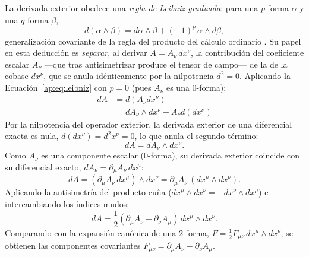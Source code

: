 \primerparrafo La derivada exterior obedece una \emph{regla de Leibniz graduada}: para una $p$-forma $\alpha$ y una $q$-forma $\beta$,
\begin{equation}
    d(\alpha \wedge \beta) = d\alpha \wedge \beta + (-1)^{p}\, \alpha \wedge d\beta ,
    \label{ap:eq:leibniz}
\end{equation}
generalización covariante de la regla del producto del cálculo ordinario \parencite{nakahara-2003, baez-muniain-1994}. Su papel en esta deducción es \emph{separar}, al derivar $A = A_\nu\, dx^\nu$, la contribución del coeficiente escalar $A_\nu$ ---que tras antisimetrizar produce el tensor de campo--- de la de la cobase $dx^\nu$, que se anula idénticamente por la nilpotencia $d^2=0$. Aplicando la Ecuación~\eqref{ap:eq:leibniz} con $p=0$ (pues $A_\nu$ es una 0-forma):
\begin{align}
    dA &= d(A_\nu dx^\nu) \nonumber \\
       &= dA_\nu \wedge dx^\nu + A_\nu d(dx^\nu)
\end{align}
Por la nilpotencia del operador exterior, la derivada exterior de una diferencial exacta es nula, $d(dx^\nu) = d^2 x^\nu = 0$, lo que anula el segundo término:
\begin{equation}
    dA = dA_\nu \wedge dx^\nu .
\end{equation}
Como $A_\nu$ es una componente escalar (0-forma), su derivada exterior coincide con su diferencial exacto, $dA_\nu = \partial_\mu A_\nu\, dx^\mu$:
\begin{equation}
    dA = (\partial_\mu A_\nu\, dx^\mu) \wedge dx^\nu = \partial_\mu A_\nu\,(dx^\mu \wedge dx^\nu) .
\end{equation}
Aplicando la antisimetría del producto cuña ($dx^\mu \wedge dx^\nu = -dx^\nu \wedge dx^\mu$) e intercambiando los índices mudos:
\begin{equation}
    dA = \frac{1}{2} (\partial_\mu A_\nu - \partial_\nu A_\mu)\, dx^\mu \wedge dx^\nu .
\end{equation}
Comparando con la expansión canónica de una 2-forma, $F = \tfrac{1}{2} F_{\mu\nu}\, dx^\mu \wedge dx^\nu$, se obtienen las componentes covariantes $F_{\mu\nu} = \partial_\mu A_\nu - \partial_\nu A_\mu$.


